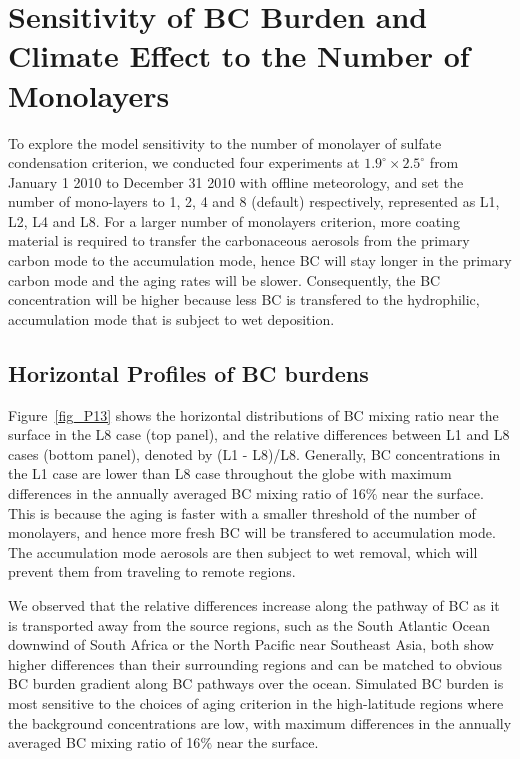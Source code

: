 \documentclass[12pt, fullpage]{uiucthesis2009}
\begin{document}
	
	\section{Sensitivity of BC Burden and Climate Effect to the Number of Monolayers}{\label{sec_1}}
	To explore the model sensitivity to the number of monolayer of sulfate condensation criterion, we conducted four experiments at $1.9^\circ \times 2.5^\circ$ from January 1 2010 to December 31 2010 with offline meteorology, and set the number of mono-layers to 1, 2, 4 and 8 (default) respectively, represented as L1, L2, L4 and L8.	For a larger number of monolayers criterion, more coating material is required to transfer the carbonaceous aerosols from the primary carbon mode to the accumulation mode, hence BC will stay longer in the primary carbon mode and the aging rates will be slower. Consequently, the BC concentration will be higher because less BC is transfered to the hydrophilic, accumulation mode that is subject to wet deposition. 
	\subsection{Horizontal Profiles of BC burdens}
	Figure~\ref{fig_P13} shows the horizontal distributions of BC mixing ratio near the surface in the L8 case (top panel), and the relative differences between L1 and L8 cases (bottom panel), denoted by (L1 - L8)/L8. Generally, BC concentrations in the L1 case are lower than L8 case throughout the globe with maximum differences in the annually averaged BC mixing ratio of 16$\%$ near the surface. This is because the aging is faster with a smaller threshold of the number of monolayers, and hence more fresh BC will be transfered to accumulation mode. The accumulation mode aerosols are then subject to wet removal, which will prevent them from traveling to remote regions.     
	
	We observed that the relative differences increase along the pathway of BC as it is transported away from the source regions, such as the South Atlantic Ocean downwind of South Africa or the North Pacific near Southeast Asia, both show higher differences than their surrounding regions and can be matched to obvious BC burden gradient along BC pathways over the ocean. Simulated BC burden is most sensitive to the choices of aging criterion in the high-latitude regions where the background concentrations are low, with maximum differences in the annually averaged BC mixing ratio of 16$\%$ near the surface. 
	
\end{document}
